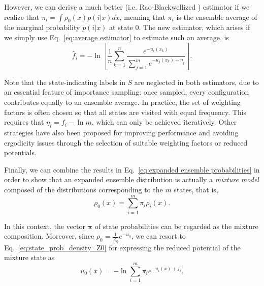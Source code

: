 \documentclass[journal=jctcce,manuscript=article,layout=twocolumn]{achemso}
\newcommand{\vt}[1]{\boldsymbol{\mathbf{#1}}}   %
\begin{document}
However, we can derive a much better (i.e. Rao-Blackwellized \cite{Carlson_2016, Ding_2017}) estimator if we realize that $\pi_i = \int \rho_0(x) p(i|x) dx$, meaning that $\pi_i$ is the ensemble average of the marginal probability $p(i|x)$ at state $0$. The new estimator, which arises if we simply use Eq.~\eqref{eq:average estimator} to estimate such an average, is
\begin{equation}
\label{eq:expanded ensemble FEP estimator}
\hat f_i = -\ln \left[ \frac{1}{n}\sum_{k=1}^n \frac{e^{-u_i(x_k)}}{\sum_{j=1}^m e^{-u_j(x_k) + \eta_j}} \right].
\end{equation}

Note that the state-indicating labels in $S$ are neglected in both estimators, due to an essential feature of importance sampling: once sampled, every configuration contributes equally to an ensemble average. In practice, the set of weighting factors is often chosen so that all states are visited with equal frequency. This requires that $\eta_i = f_i - \ln m$, which can only be achieved iteratively. Other strategies have also been proposed\cite{Katzgraber_2006, Trebst_2006, Escobedo_2007, Escobedo_2008, Martinez-veracoechea_2008} for improving performance and avoiding ergodicity issues through the selection of suitable weighting factors or reduced potentials.

Finally, we can combine the results in Eq.~\eqref{eq:expanded ensemble probabilities} in order to show that an expanded ensemble distribution is actually a \textit{mixture model} \cite{Lindsay_1995, Marin_2005} composed of the distributions corresponding to the $m$ states, that is,
\begin{equation}
\label{eq:mixture ensemble}
\rho_0(x) = \sum_{i=1}^m \pi_i \rho_i(x).
\end{equation}

In this context, the vector $\vt \pi$ of state probabilities can be regarded as the mixture composition. Moreover, since $\rho_0 = \frac{1}{Z_0}e^{-u_0}$, we can resort to Eq.~\eqref{eq:state_prob_density_Z0} for expressing the reduced potential of the mixture state as
\begin{equation}
\label{eq:mixture potential}
u_0(x) = -\ln \sum_{i=1}^m \pi_i e^{-u_i(x) + f_i}.
\end{equation}
\end{document}
